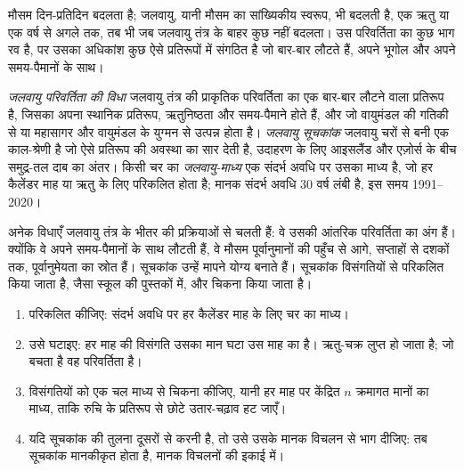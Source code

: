 मौसम दिन-प्रतिदिन बदलता है; जलवायु, यानी मौसम का सांख्यिकीय स्वरूप, भी बदलती है, एक ऋतु
या एक वर्ष से अगले तक, तब भी जब जलवायु तंत्र के बाहर कुछ नहीं बदलता। उस परिवर्तिता का
कुछ भाग रव है, पर उसका अधिकांश कुछ ऐसे प्रतिरूपों में संगठित है जो बार-बार लौटते हैं, अपने
भूगोल और अपने समय-पैमानों के साथ।

\begin{definition}\label{def:b2:climate-variability:modes}
\emph{जलवायु परिवर्तिता की विधा} जलवायु तंत्र की प्राकृतिक
परिवर्तिता का एक बार-बार लौटने वाला प्रतिरूप है, जिसका अपना स्थानिक प्रतिरूप, ऋतुनिष्ठता और समय-पैमाने
होते हैं, और जो वायुमंडल की गतिकी से या महासागर और वायुमंडल के युग्मन से उत्पन्न होता है।
\emph{जलवायु सूचकांक} जलवायु चरों से बनी एक काल-श्रेणी है
जो ऐसे प्रतिरूप की अवस्था का सार देती है, उदाहरण के लिए आइसलैंड और एज़ोर्स के बीच समुद्र-तल
दाब का अंतर। किसी चर का \emph{जलवायु-माध्य}
एक संदर्भ अवधि पर उसका माध्य है, जो हर कैलेंडर माह या ऋतु के लिए परिकलित होता है; मानक
संदर्भ अवधि 30 वर्ष लंबी है, इस समय 1991--2020।
\end{definition}

अनेक विधाएँ जलवायु तंत्र के भीतर की प्रक्रियाओं से चलती हैं: वे उसकी
आंतरिक परिवर्तिता का अंग हैं। क्योंकि वे अपने समय-पैमानों के साथ लौटती हैं, वे मौसम पूर्वानुमानों की
पहुँच से आगे, सप्ताहों से दशकों तक, पूर्वानुमेयता का स्रोत हैं। सूचकांक उन्हें मापने योग्य बनाते हैं।
सूचकांक विसंगतियों से परिकलित किया जाता है, जैसा स्कूल की पुस्तकों में, और
चिकना किया जाता है।

\begin{method}[प्रेक्षणों से सूचकांक तक]\label{met:b2:climate-variability:index}
\begin{enumerate}
  \item {} परिकलित कीजिए: संदर्भ अवधि पर हर कैलेंडर माह के लिए चर का
        माध्य।
  \item उसे घटाइए: हर माह की विसंगति उसका मान घटा उस माह का  है।
        ऋतु-चक्र लुप्त हो जाता है; जो बचता है वह परिवर्तिता है।
  \item विसंगतियों को एक चल माध्य से चिकना कीजिए, यानी हर माह पर केंद्रित $n$ क्रमागत मानों का माध्य,
        ताकि रुचि के प्रतिरूप से छोटे उतार-चढ़ाव हट जाएँ।
  \item यदि सूचकांक की तुलना दूसरों से करनी है, तो उसे उसके मानक विचलन से भाग दीजिए: तब सूचकांक
        मानकीकृत होता है, मानक विचलनों की इकाई में।
\end{enumerate}
\end{method}

